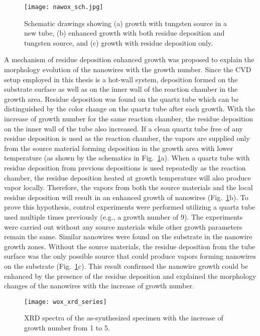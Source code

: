 \begin{figure}[htb]
\centering
\texttt{[image: nawox\_sch.jpg]}
\caption[Schematic drawings of residual  growth]{Schematic drawings showing (a) growth with tungsten source in a new tube, (b) enhanced growth with both residue deposition and tungsten source, and (c) growth with residue deposition only.}
\label{fig:nawoxsch}
\end{figure}

A mechanism of residue deposition enhanced growth was proposed to explain the morphology evolution of the nanowires with the growth number. Since the CVD setup employed in this thesis is a hot-wall system, deposition formed on the substrate surface as well as on the inner wall of the reaction chamber in the growth area. Residue deposition was found on the quartz tube which can be distinguished by the color change on the quartz tube after each growth. With the increase of growth number for the same reaction chamber, the residue deposition on the inner wall of the tube also increased. If a clean quartz tube free of any residue deposition is used as the reaction chamber, the vapors are supplied only from the source material forming deposition in the growth area with lower temperature (as shown by the schematics in Fig.~\ref{fig:nawoxsch}a). When a quartz tube with residue deposition from previous depositions is used repeatedly as the reaction chamber, the residue deposition heated at growth temperature will also produce vapor locally. Therefore, the vapors from both the source materials and the local residue deposition will result in an enhanced growth of nanowires (Fig.~\ref{fig:nawoxsch}b). To prove this hypothesis, control experiments were performed utilizing a quartz tube used multiple times previously (e.g., a growth number of 9). The experiments were carried out without any source materials while other growth parameters remain the same. Similar nanowires were found on the substrate in the nanowire growth zones. Without the source materials, the residue deposition from the tube surface was the only possible source that could produce vapors forming nanowires on the substrate (Fig.~\ref{fig:nawoxsch}c). This result confirmed the nanowire growth could be enhanced by the presence of the residue deposition and explained the morphology changes of the nanowires with the increase of growth number.
\begin{figure}[htb]
\centering
\texttt{[image: wox\_xrd\_series]}
\caption[XRD spectra evolution of  growth]{XRD spectra of the as-synthesized specimen with the increase of growth number from 1 to 5.}
\label{fig:nawoxxrd}
\end{figure}

